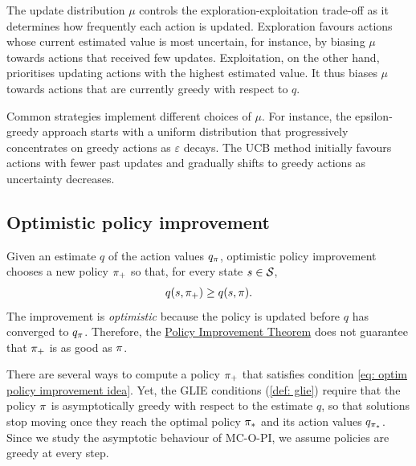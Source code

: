 \begin{remark}
\label{rmk: exploration-exploitation tradeoff}
The update distribution $\mu$ controls the exploration-exploitation trade-off
as it determines how frequently each action is updated.
Exploration favours actions whose current estimated value is most uncertain, for instance, by biasing $\mu$ towards actions that received few updates.
Exploitation, on the other hand, prioritises updating actions with the highest estimated value. It thus biases $\mu$ towards actions that are currently greedy with respect to $q$.

Common strategies implement different choices of $\mu$. 
For instance, the epsilon-greedy approach starts with a uniform distribution that progressively concentrates on greedy actions as $\varepsilon$ decays.
The UCB method 
initially favours
actions with fewer past updates and gradually shifts to greedy actions as uncertainty decreases.
\end{remark}


\subsection{Optimistic policy improvement}

Given an estimate $q$ of the action values $q_\pi$, optimistic policy improvement chooses a new policy $\pi_+$ so that, for every state $s \in \mathcal{S}$,
\begin{align}
\label{eq: optim policy improvement idea}
    q(s, \pi_+) \geq q(s, \pi) .
\end{align}
The improvement is \textit{optimistic} because the policy is updated before $q$ has converged to $q_{\pi}$. Therefore, the \hyperref[thm: policy improvement theorem]{Policy Improvement Theorem} does not guarantee that $\pi_+$ is as good as $\pi$.

There are several ways to compute a policy $\pi_+$ that satisfies condition \eqref{eq: optim policy improvement idea}.
Yet, the GLIE conditions (\autoref{def: glie}) require that the policy $\pi$ is asymptotically greedy with respect to the estimate $q$, so that solutions stop moving once they reach the optimal policy ${\pi}_*$ and its action values $q_{{\pi}_*}$.
Since we study the asymptotic behaviour of MC-O-PI, we assume policies are greedy at every step.

